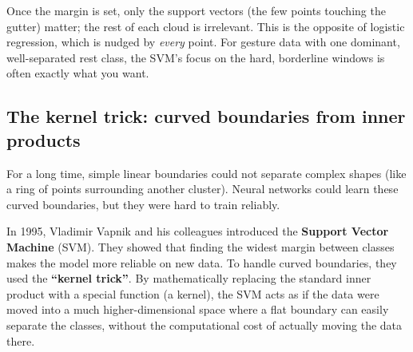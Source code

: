 \begin{happeningbox}
Once the margin is set, only the support vectors (the few
points touching the gutter) matter; the rest of each cloud is irrelevant. This is the
opposite of logistic regression, which is nudged by \emph{every} point. For gesture
data with one dominant, well-separated rest class, the SVM's focus on the hard,
borderline windows is often exactly what you want.
\end{happeningbox}

\subsection{The kernel trick: curved boundaries from inner products}
\label{ch39:kernel}

\begin{historybox}
For a long time, simple linear boundaries could not separate complex shapes (like a ring of points surrounding another cluster). Neural networks could learn these curved boundaries, but they were hard to train reliably.

In 1995, Vladimir Vapnik and his colleagues introduced the \textbf{Support Vector Machine} (SVM). They showed that finding the widest margin between classes makes the model more reliable on new data. To handle curved boundaries, they used the \textbf{``kernel trick''}. By mathematically replacing the standard inner product with a special function (a kernel), the SVM acts as if the data were moved into a much higher-dimensional space where a flat boundary can easily separate the classes, without the computational cost of actually moving the data there.
\end{historybox}

